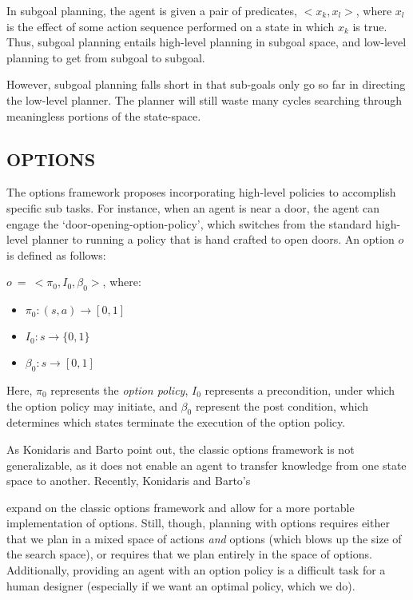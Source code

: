 In subgoal planning, the agent is given a pair of predicates, $<x_k, x_l >$, where $x_l$ is the effect of some action sequence performed on a state in which $x_k$ is true. Thus, subgoal planning entails high-level planning in subgoal space, and low-level planning to get from subgoal to subgoal.

However, subgoal planning falls short in that sub-goals only go so far in directing the low-level planner. The planner will still waste many cycles searching through meaningless portions of the state-space.



\subsection{OPTIONS}

The options framework proposes incorporating high-level policies to accomplish specific sub tasks. For instance, when an agent is near a door, the agent can engage the `door-opening-option-policy', which switches from the standard high-level planner to running a policy that is hand crafted to open doors. An option $o$ is defined as follows:

$o\ =\ <\pi_0, I_0, \beta_0>$, where:

\begin{itemize}
\item[] $\pi_0 : (s,a) \rightarrow [0,1]$
\item[] $I_0 : s \rightarrow \{0,1\}$
\item[] $\beta_0 : s \rightarrow [0,1]$
\end{itemize}

Here, $\pi_0$ represents the {\it option policy}, $I_0$ represents a precondition, under which the option policy may initiate, and $\beta_0$ represent the post condition, which determines which states terminate the execution of the option policy.

As Konidaris and Barto point out, the classic options framework is not generalizable, as it does not enable an agent to transfer knowledge from one state space to another. Recently, Konidaris and Barto's  expand on the classic options framework and allow for a more portable implementation of options. Still, though, planning with options requires either that we plan in a mixed space of actions {\it and} options (which blows up the size of the search space), or requires that we plan entirely in the space of options. Additionally, providing an agent with an option policy is a difficult task for a human designer (especially if we want an optimal policy, which we do).

